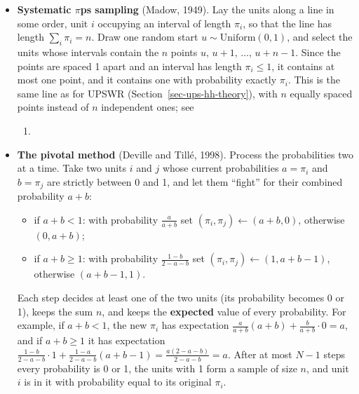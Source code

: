 \documentclass[
  letterpaper,
  DIV=11,
  numbers=noendperiod]{scrreprt}
\providecommand{\tightlist}{%
  \setlength{\itemsep}{0pt}\setlength{\parskip}{0pt}}
\renewcommand{\[}{\begin{equation}}
\renewcommand{\]}{\end{equation}}
\begin{document}
\begin{itemize}
\tightlist
\item
  \textbf{Systematic \(\pi\)ps sampling} (Madow, 1949). Lay the units
  along a line in some order, unit \(i\) occupying an interval of length
  \(\pi_i\), so that the line has length \(\sum_i\pi_i=n\). Draw one
  random start \(u\sim\mathrm{Uniform}(0,1)\), and select the units
  whose intervals contain the \(n\) points \(u,\,u+1,\,\dots,\,u+n-1\).
  Since the points are spaced 1 apart and an interval has length
  \(\pi_i\le1\), it contains at most one point, and it contains one with
  probability exactly \(\pi_i\). This is the same line as for UPSWR
  (Section~\ref{sec-ups-hh-theory}), with \(n\) equally spaced points
  instead of \(n\) independent ones; see

  \begin{enumerate}
  \def\labelenumi{\arabic{enumi}.}
  \tightlist
  \item
  \end{enumerate}
\item
  \textbf{The pivotal method} (Deville and Tillé, 1998). Process the
  probabilities two at a time. Take two units \(i\) and \(j\) whose
  current probabilities \(a=\pi_i\) and \(b=\pi_j\) are strictly between
  0 and 1, and let them ``fight'' for their combined probability
  \(a+b\):

  \begin{itemize}
  \tightlist
  \item
    if \(a+b<1\): with probability \(\frac{a}{a+b}\) set
    \((\pi_i,\pi_j)\leftarrow(a+b,0)\), otherwise \((0,a+b)\);
  \item
    if \(a+b\ge1\): with probability \(\frac{1-b}{2-a-b}\) set
    \((\pi_i,\pi_j)\leftarrow(1,a+b-1)\), otherwise \((a+b-1,1)\).
  \end{itemize}

  Each step decides at least one of the two units (its probability
  becomes 0 or 1), keeps the sum \(n\), and keeps the \textbf{expected}
  value of every probability. For example, if \(a+b<1\), the new
  \(\pi_i\) has expectation
  \(\frac{a}{a+b}(a+b)+\frac{b}{a+b}\cdot0=a\), and if \(a+b\ge1\) it
  has expectation
  \(\frac{1-b}{2-a-b}\cdot1+\frac{1-a}{2-a-b}(a+b-1)=\frac{a(2-a-b)}{2-a-b}=a\).
  After at most \(N-1\) steps every probability is 0 or 1, the units
  with 1 form a sample of size \(n\), and unit \(i\) is in it with
  probability equal to its original \(\pi_i\).
\end{itemize}
\end{document}
